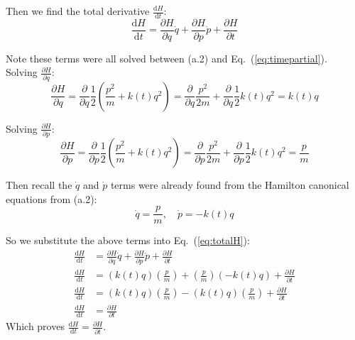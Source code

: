 \documentclass[titlepage]{article}
\begin{document}
Then we find the total derivative $\frac{\mathrm{d}H}{\mathrm{d}t}$:
\begin{equation}
	\frac{\mathrm{d}H}{\mathrm{d}t}=\frac{\partial H}{\partial q}\dot{q}+\frac{\partial H}{\partial p}\dot{p}+\frac{\partial H}{\partial t}
	\label{eq:totalH}
\end{equation}

Note these terms were all solved between (a.2) and Eq.~(\ref{eq:timepartial}).\\

Solving $\frac{\partial H}{\partial q}$:
\begin{equation}
	\frac{\partial H}{\partial q}=\frac{\partial}{\partial q}\frac{1}{2}\left(\frac{p^2}{m}+k(t)q^2\right)=\frac{\partial}{\partial q}\frac{p^2}{2m}+\frac{\partial}{\partial q}\frac{1}{2}k(t)q^2=k(t)q
\end{equation}

Solving $\frac{\partial H}{\partial p}$:
\begin{equation}
	\frac{\partial H}{\partial p}=\frac{\partial}{\partial p}\frac{1}{2}\left(\frac{p^2}{m}+k(t)q^2\right)=\frac{\partial}{\partial p}\frac{p^2}{2m}+\frac{\partial}{\partial p}\frac{1}{2}k(t)q^2=\frac{p}{m}
\end{equation}

Then recall the $\dot{q}$ and $\dot{p}$ terms were already found from the Hamilton canonical equations from (a.2):
\begin{equation}
	\dot{q}=\frac{p}{m},\quad\dot{p}=-k(t)q
\end{equation}

\begin{mdframed}[linewidth=1pt, innertopmargin=10pt, innerbottommargin=10pt]
	So we substitute the above terms into Eq.~(\ref{eq:totalH}):
	\begin{equation}
		\begin{split}
			\frac{\mathrm{d}H}{\mathrm{d}t}&=\frac{\partial H}{\partial q}\dot{q}+\frac{\partial H}{\partial p}\dot{p}+\frac{\partial H}{\partial t} \\
			\frac{\mathrm{d}H}{\mathrm{d}t}&= \left(k(t)q\right)\left(\frac{p}{m}\right)+\left(\frac{p}{m}\right)\left(-k(t)q\right)+\frac{\partial H}{\partial t}  \\
			\frac{\mathrm{d}H}{\mathrm{d}t}&=\left(k(t)q\right)\left(\frac{p}{m}\right)-\left(k(t)q\right)\left(\frac{p}{m}\right)+\frac{\partial H}{\partial t} \\
			\frac{\mathrm{d}H}{\mathrm{d}t}&=\frac{\partial H}{\partial t}
		\end{split}
	\end{equation}
	Which proves $\frac{\mathrm{d}H}{\mathrm{d}t}=\frac{\partial H}{\partial t}$.\\
\end{mdframed}
\end{document}
